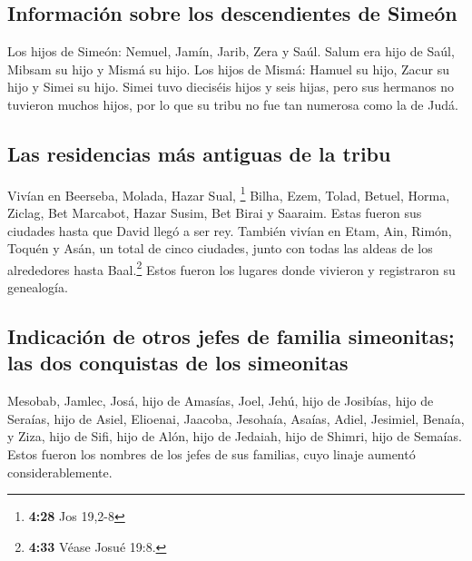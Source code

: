\hypertarget{informaciuxf3n-sobre-los-descendientes-de-simeuxf3n}{%
\subsection{Información sobre los descendientes de
Simeón}\label{informaciuxf3n-sobre-los-descendientes-de-simeuxf3n}}

 Los hijos de Simeón: Nemuel, Jamín, Jarib, Zera y Saúl.
 Salum era hijo de Saúl, Mibsam su hijo y Mismá su hijo.
 Los hijos de Mismá: Hamuel su hijo, Zacur su hijo y
Simei su hijo.  Simei tuvo dieciséis hijos y seis hijas,
pero sus hermanos no tuvieron muchos hijos, por lo que su tribu no fue
tan numerosa como la de Judá.

\hypertarget{las-residencias-muxe1s-antiguas-de-la-tribu}{%
\subsection{Las residencias más antiguas de la
tribu}\label{las-residencias-muxe1s-antiguas-de-la-tribu}}

 Vivían en Beerseba, Molada, Hazar Sual, \footnote{\textbf{4:28}
  Jos 19,2-8}  Bilha, Ezem, Tolad, 
Betuel, Horma, Ziclag,  Bet Marcabot, Hazar Susim, Bet
Birai y Saaraim. Estas fueron sus ciudades hasta que David llegó a ser
rey.  También vivían en Etam, Ain, Rimón, Toquén y Asán,
un total de cinco ciudades,  junto con todas las aldeas
de los alrededores hasta Baal.\footnote{\textbf{4:33} Véase Josué 19:8.}
Estos fueron los lugares donde vivieron y registraron su genealogía.

\hypertarget{indicaciuxf3n-de-otros-jefes-de-familia-simeonitas-las-dos-conquistas-de-los-simeonitas}{%
\subsection{Indicación de otros jefes de familia simeonitas; las dos
conquistas de los
simeonitas}\label{indicaciuxf3n-de-otros-jefes-de-familia-simeonitas-las-dos-conquistas-de-los-simeonitas}}

 Mesobab, Jamlec, Josá, hijo de Amasías, 
Joel, Jehú, hijo de Josibías, hijo de Seraías, hijo de Asiel,
 Elioenai, Jaacoba, Jesohaía, Asaías, Adiel, Jesimiel,
Benaía,  y Ziza, hijo de Sifi, hijo de Alón, hijo de
Jedaiah, hijo de Shimri, hijo de Semaías.  Estos fueron
los nombres de los jefes de sus familias, cuyo linaje aumentó
considerablemente.

